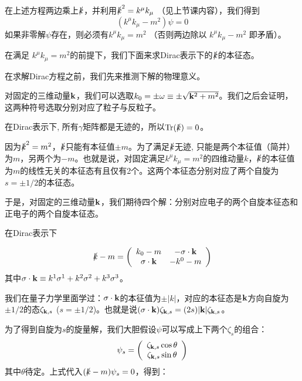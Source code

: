 \documentclass[CJK]{beamer}
\begin{document}
\begin{frame}
\bch
在上述方程两边乘上$\slashed{k}$，并利用$\slashed{k}^2 = k^\mu k_\mu $ （见上节课内容），我们得到
$$ (k^\mu k_\mu - m^2) \psi = 0$$
如果非零解$\psi$存在，则必须有$k^\mu k_\mu = m^2 $ （否则两边除以 $k^\mu k_\mu - m^2$ 即矛盾）。

\skipline
在满足 $k^\mu k_\mu = m^2$的前提下，我们下面来求Dirac表示下的$\slashed{k}$的本征态。
\ech
\end{frame}

\begin{frame}
\bch
在求解Dirac方程之前，我们先来推测下解的物理意义。

\skipline
对固定的三维动量$\veck$，我们可以选取$k_0 = \pm \omega \equiv \pm \sqrt{\veck^2+m^2}$。我们之后会证明，这两种符号选取分别对应了粒子与反粒子。
\skipline

在Dirac表示下, 所有$\gamma$矩阵都是无迹的，所以$\mathrm{Tr}(\slashed{k}) = 0$。
\skipline

因为$\slashed{k}^2 = m^2$，$\slashed{k}$只能有本征值$\pm m$。为了满足$\slashed{k}$无迹, 只能是两个本征值（简并）为$m$，另两个为$-m$。也就是说，对固定满足$k^\mu k_\mu = m^2$的四维动量$k$，$\slashed{k}$的本征值为$m$的线性无关的本征态有且仅有2个。这两个本征态分别对应了两个自旋为$s=\pm 1/2$的本征态。

\skipline
于是，对固定的三维动量$\veck$，我们期待四个解：分别对应电子的两个自旋本征态和正电子的两个自旋本征态。
\ech

\end{frame}

\begin{frame}
\bch
在Dirac表示下

\begin{equation}
\slashed{k} -m = 
\bmat{cc}
k_0 - m & -\vecsigma\cdot \veck \\
\vecsigma \cdot \veck & - k^0 - m
\emat \nonumber
\end{equation}
其中$\vecsigma\cdot\veck \equiv k^1\sigma^1 + k^2\sigma^2 + k^3\sigma^3 $。 


我们在量子力学里面学过：$\vecsigma \cdot \veck$的本征值为$\pm |k|$，对应的本征态是$\veck$方向自旋为$\pm 1/2$的态$\zeta_{\veck,s}$ ($s=\pm 1/2$)。也就是说$(\vecsigma\cdot\veck)\zeta_{\veck,s} = (2s)  |\veck| \zeta_{\veck,s}$。 

为了得到自旋为$s$的旋量解，我们大胆假设$\psi$可以写成上下两个$\zeta_s$的组合：
\begin{equation}
\psi_s = 
\bmat{c}
\zeta_{\veck,s} \cos\theta \\
\zeta_{\veck,s} \sin\theta
\emat\nonumber
\end{equation}
其中$\theta$待定。上式代入$(\slashed{k} - m) \psi_s = 0$，得到：
\ech
\end{frame}
\end{document}
